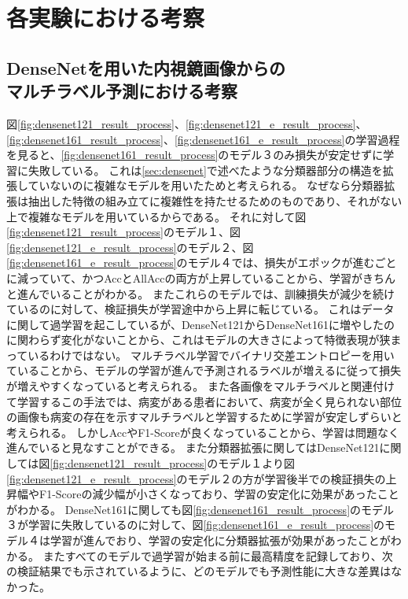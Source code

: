 \section{各実験における考察}
\subsection{DenseNetを用いた内視鏡画像からの\\マルチラベル予測における考察}
図\ref{fig:densenet121_result_process}、\ref{fig:densenet121_e_result_process}、\ref{fig:densenet161_result_process}、\ref{fig:densenet161_e_result_process}の学習過程を見ると、\ref{fig:densenet161_result_process}のモデル３のみ損失が安定せずに学習に失敗している。
これは\ref{sec:densenet}で述べたような分類器部分の構造を拡張していないのに複雑なモデルを用いたためと考えられる。
なぜなら分類器拡張は抽出した特徴の組み立てに複雑性を持たせるためのものであり、それがない上で複雑なモデルを用いているからである。
それに対して図\ref{fig:densenet121_result_process}のモデル１、図\ref{fig:densenet121_e_result_process}のモデル２、図\ref{fig:densenet161_e_result_process}のモデル４では、損失がエポックが進むごとに減っていて、かつAccとAllAccの両方が上昇していることから、学習がきちんと進んでいることがわかる。
またこれらのモデルでは、訓練損失が減少を続けているのに対して、検証損失が学習途中から上昇に転じている。
これはデータに関して過学習を起こしているが、DenseNet121からDenseNet161に増やしたのに関わらず変化がないことから、これはモデルの大きさによって特徴表現が狭まっているわけではない。
マルチラベル学習でバイナリ交差エントロピーを用いていることから、モデルの学習が進んで予測されるラベルが増えるに従って損失が増えやすくなっていると考えられる。
また各画像をマルチラベルと関連付けて学習するこの手法では、病変がある患者において、病変が全く見られない部位の画像も病変の存在を示すマルチラベルと学習するために学習が安定しずらいと考えられる。
しかしAccやF1-Scoreが良くなっていることから、学習は問題なく進んでいると見なすことができる。
また分類器拡張に関してはDenseNet121に関しては図\ref{fig:densenet121_result_process}のモデル１より図\ref{fig:densenet121_e_result_process}のモデル２の方が学習後半での検証損失の上昇幅やF1-Scoreの減少幅が小さくなっており、学習の安定化に効果があったことがわかる。
DenseNet161に関しても図\ref{fig:densenet161_result_process}のモデル３が学習に失敗しているのに対して、図\ref{fig:densenet161_e_result_process}のモデル４は学習が進んでおり、学習の安定化に分類器拡張が効果があったことがわかる。
またすべてのモデルで過学習が始まる前に最高精度を記録しており、次の検証結果でも示されているように、どのモデルでも予測性能に大きな差異はなかった。

